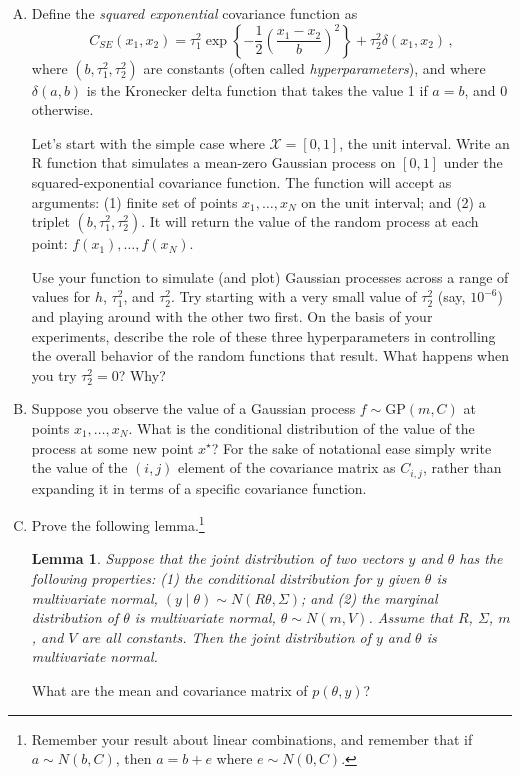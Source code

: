 \documentclass{mynotes}
\newtheorem{lemma}[theorem]{Lemma}
\begin{document}
\begin{enumerate}[(A)]
\item   Define the \textit{squared exponential} covariance function as
$$
C_{SE}(x_1, x_2) = \tau_1^2 \exp \left\{ - \frac{1}{2} \left( \frac{x_1 - x_2}{b} \right)^2 \right\} + \tau^2_2 \delta(x_1, x_2) \, ,
$$
where $(b, \tau^2_1, \tau^2_2)$ are constants (often called \textit{hyperparameters}), and where $\delta(a,b)$ is the Kronecker delta function that takes the value 1 if $a=b$, and 0 otherwise.

Let's start with the simple case where $\mathcal{X} = [0,1]$, the unit interval.  Write an R function that simulates a mean-zero Gaussian process on $[0,1]$ under the squared-exponential covariance function.  The function will accept as arguments: (1) finite set of points $x_1, \ldots, x_N$ on the unit interval; and (2) a triplet $(b, \tau^2_1, \tau^2_2)$. It will return the value of the random process at each point: $f(x_1), \ldots, f(x_N)$.

Use your function to simulate (and plot) Gaussian processes across a range of values for $h$, $\tau^2_1$, and $\tau^2_2$.  Try starting with a very small value of $\tau^2_2$ (say, $10^{-6}$) and playing around with the other two first.  On the basis of your experiments, describe the role of these three hyperparameters in controlling the overall behavior of the random functions that result.  What happens when you try $\tau^2_2 = 0$? Why?

\item Suppose you observe the value of a Gaussian process $f \sim \mbox{GP}(m,C)$ at points $x_1, \ldots, x_N$.  What is the conditional distribution of the value of the process at some new point $x^{\star}$?  For the sake of notational ease simply write the value of the $(i,j)$ element of the covariance matrix as $C_{i,j}$, rather than expanding it in terms of a specific covariance function.

\item Prove the following lemma.\footnote{Remember your result about linear combinations, and remember that if $a \sim N(b,C)$, then $a = b + e$ where $e \sim N(0, C)$.}

\begin{lemma}
Suppose that the joint distribution of two vectors $y$ and $\theta$ has the following properties: (1) the conditional distribution for $y$ given $\theta$ is multivariate normal, $(y \mid \theta) \sim N(R\theta, \Sigma)$; and (2) the marginal distribution of $\theta$ is multivariate normal, $\theta \sim N(m,V)$.  Assume that $R$, $\Sigma$, $m$, and $V$ are all constants.  Then the joint distribution of $y$ and $\theta$ is multivariate normal.
\end{lemma}

What are the mean and covariance matrix of $p(\theta,y)$?

\end{enumerate}
\end{document}
